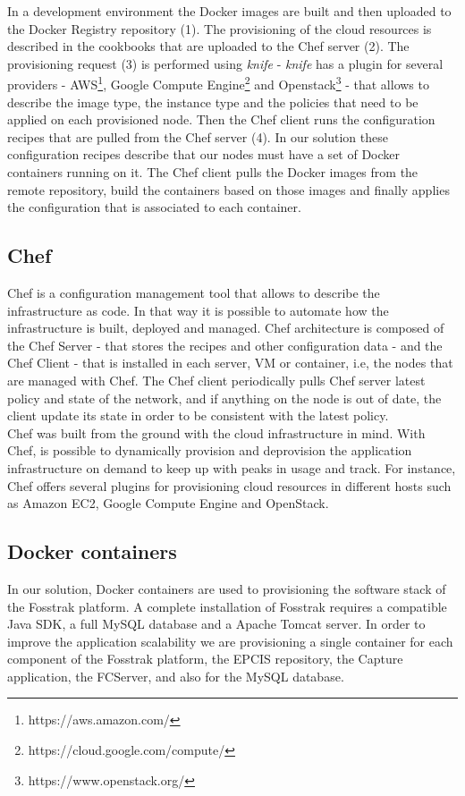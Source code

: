 In a development environment the Docker images are built and then uploaded to the Docker Registry
repository (1). The provisioning of the cloud resources is described in the cookbooks that are uploaded
to the Chef server (2). The provisioning request (3) is performed using \textit{knife} - \textit{knife}
has a plugin for several providers - \gls{AWS}\footnote{https://aws.amazon.com/}, Google Compute Engine\footnote{https://cloud.google.com/compute/}
and Openstack\footnote{https://www.openstack.org/} - that allows to describe the image type, the instance
type and the policies that need to be applied on each provisioned node. Then the Chef client runs the
configuration recipes that are pulled from the Chef server (4). In our solution these configuration
recipes describe that our nodes must have a set of Docker containers running on it. The Chef client
pulls the Docker images from the remote repository, build the containers based on those images and
finally applies the configuration that is associated to each container.

\subsection{Chef}
\label{sub:chef}
Chef is a configuration management tool that allows to describe the infrastructure as code.
In that way it is possible to automate how the infrastructure is built, deployed and managed.
Chef architecture is composed of the Chef Server - that stores the recipes and other configuration
data - and the Chef Client - that is installed in each server, \gls{VM} or container, i.e, the nodes that
are managed with Chef. The Chef client periodically pulls Chef server latest policy and state of the
network, and if anything on the node is out of date, the client update its state in order to be
consistent with the latest policy.\\

Chef was built from the ground with the cloud infrastructure in mind. With Chef, is possible to
dynamically provision and deprovision the application infrastructure on demand to keep up with
peaks in usage and track. For instance, Chef offers several plugins for provisioning cloud resources
in different hosts such as Amazon \gls{EC2}, Google Compute Engine and OpenStack.

\subsection{Docker containers}
\label{sub:impl_containers}
In our solution, Docker containers are used to provisioning the software stack of the Fosstrak platform.
A complete installation of Fosstrak requires a compatible Java SDK, a full MySQL database and a Apache
Tomcat server. In order to improve the application scalability we are provisioning a single container
for each component of the Fosstrak platform, the \gls{EPCIS} repository, the Capture application, the
\gls{FCServer}, and also for the MySQL database.\\

